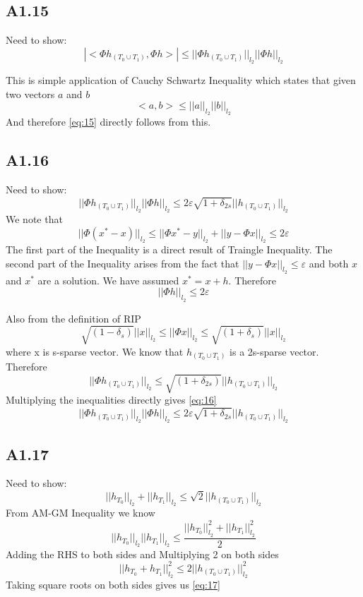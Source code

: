 \documentclass{article}
\newcommand{\ltwo}[1]{
  ||#1||_{l_2}
}
\newcommand{\hto}[1]{
  h_{#1}
}
\newcommand{\htzo}{
  h_{(T_0 \cup T_1)}
}
\begin{document}
\subsection*{A1.15}
Need to show:
\begin{equation}
  \label{eq:15}
  |<\Phi\htzo,\Phi h>| \le \ltwo{\Phi\htzo}\ltwo{\Phi h}
\end{equation}

This is simple application of Cauchy Schwartz Inequality which states that given two vectors $a$ and $b$
$$<a,b> \le \ltwo{a}\ltwo{b}$$
And therefore \ref{eq:15} directly follows from this.

\subsection*{A1.16}
Need to show:
\begin{equation}
  \label{eq:16}
  \ltwo{\Phi\htzo}\ltwo{\Phi h} \le 2 \varepsilon \sqrt{1+\delta_{2s}}\ltwo{\htzo}
\end{equation}
We note that
$$\ltwo{\Phi(x^* - x)} \le \ltwo{\Phi x^* - y} + \ltwo{y - \Phi x} \le 2\varepsilon$$
The first part of the Inequality is a direct result of Traingle Inequality. The second part of the Inequality arises from the fact that
$\ltwo{y - \Phi x} \le \varepsilon$ and both $x$ and $x^*$ are a solution.
We have assumed $x^* = x + h$. Therefore
$$\ltwo{\Phi h} \le 2\varepsilon$$

Also from the definition of RIP
$$\sqrt{(1 - \delta_{s})} \ltwo{x} \le \ltwo{\Phi x} \le \sqrt{(1+\delta_s)} \ltwo{x}$$
where x is s-sparse vector.
We know that $\htzo$ is a 2s-sparse vector. Therefore
$$\ltwo{\Phi \htzo} \le \sqrt{(1+\delta_{2s})}\ltwo{\htzo}$$
Multiplying the inequalities directly gives \ref{eq:16}
$$\ltwo{\Phi\htzo}\ltwo{\Phi h} \le 2 \varepsilon \sqrt{1+\delta_{2s}}\ltwo{\htzo}$$

\subsection*{A1.17}
Need to show:
\begin{equation}
  \label{eq:17}
  \ltwo{\hto{T_0}} + \ltwo{\hto{T_1}} \le \sqrt{2}\ltwo{\htzo}
\end{equation}
From AM-GM Inequality we know
$$\ltwo{\hto{T_0}}\ltwo{\hto{T_1}} \le \frac{\ltwo{\hto{T_0}}^2 + \ltwo{\hto{T_1}}^2}{2}$$
Adding the RHS to both sides and Multiplying 2 on both sides
$$\ltwo{\hto{T_0} + \hto{T_1}}^2 \le 2\ltwo{\htzo}^2$$
Taking square roots on both sides gives us \ref{eq:17}
\end{document}

